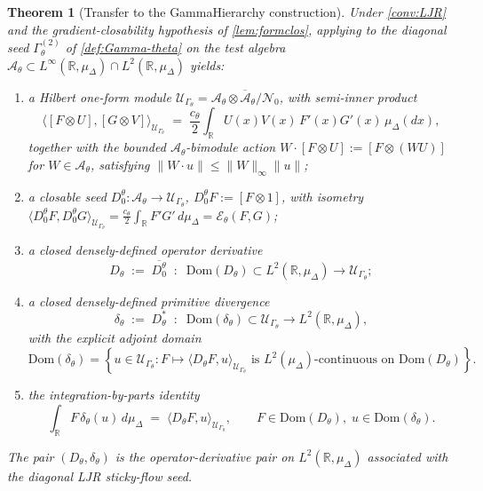 \documentclass[11pt,reqno]{amsart}
\theoremstyle{plain}
\newtheorem{theorem}{Theorem}[section]
\theoremstyle{definition}
\theoremstyle{remark}
\newcommand{\R}{\mathbb{R}}
\newcommand{\Dom}{\mathrm{Dom}}
\newcommand{\cA}{\mathcal A}
\newcommand{\cE}{\mathcal E}
\newcommand{\cU}{\mathcal U}
\newcommand{\Dth}{D_{\theta}}
\newcommand{\divth}{\delta_{\theta}}
\begin{document}
\begin{theorem}[Transfer to the GammaHierarchy construction]\label{thm:transfer}
Under \cref{conv:LJR} and the gradient-closability hypothesis of
\cref{lem:formclos}, applying
\cite[Thm.~A and Thm.~B]{GammaHierarchyDivergence} to the
diagonal seed $\Gamma^{(2)}_{\theta}$ of \cref{def:Gamma-theta}
on the test algebra $\cA_{\theta}\subset L^{\infty}(\R,\mu_{\Delta})\cap L^{2}(\R,\mu_{\Delta})$
yields:
\begin{enumerate}
\item[$(\mathrm i)$] a Hilbert one-form module
$\cU_{\Gamma_{\theta}}=\overline{\cA_{\theta}\otimes\cA_{\theta}/\mathcal N_{0}}$,
with semi-inner product
\[
  \langle [F\otimes U],[G\otimes V]\rangle_{\cU_{\Gamma_{\theta}}}
  \;=\;\frac{c_{\theta}}{2}\!\int_{\R}\!U(x)V(x)\,F'(x)G'(x)\,\mu_{\Delta}(dx),
\]
together with the bounded $\cA_{\theta}$-bimodule action
$W\cdot[F\otimes U]:=[F\otimes(WU)]$ for $W\in\cA_{\theta}$,
satisfying $\|W\cdot u\|\le\|W\|_{\infty}\|u\|$;
\item[$(\mathrm{ii})$] a closable seed
$D_{0}^{\theta}\colon\cA_{\theta}\to\cU_{\Gamma_{\theta}}$,
$D_{0}^{\theta}F:=[F\otimes 1]$, with isometry
$\langle D_{0}^{\theta}F,D_{0}^{\theta}G\rangle_{\cU_{\Gamma_{\theta}}}
=\frac{c_{\theta}}{2}\int_{\R}F'G'\,d\mu_{\Delta}=\cE_{\theta}(F,G)$;
\item[$(\mathrm{iii})$] a closed densely-defined operator
derivative
\[
  \Dth\;:=\;\overline{D_{0}^{\theta}}\;\;\colon\;\;\Dom(\Dth)\subset L^{2}(\R,\mu_{\Delta})\to\cU_{\Gamma_{\theta}};
\]
\item[$(\mathrm{iv})$] a closed densely-defined primitive
divergence
\[
  \divth\;:=\;\Dth^{*}\;\;\colon\;\;\Dom(\divth)\subset\cU_{\Gamma_{\theta}}\to L^{2}(\R,\mu_{\Delta}),
\]
with the explicit adjoint domain
\[
  \Dom(\divth)
  =
  \left\{
  u\in\cU_{\Gamma_{\theta}}:
  F\mapsto\langle\Dth F,u\rangle_{\cU_{\Gamma_{\theta}}}
  \text{ is }L^{2}(\mu_{\Delta})\text{-continuous on }\Dom(\Dth)
  \right\}.
\]
\item[$(\mathrm v)$] the integration-by-parts identity
\begin{equation}\label{eq:IBP-theta}
  \int_{\R}F\,\divth(u)\,d\mu_{\Delta}
  \;=\;\langle\Dth F,u\rangle_{\cU_{\Gamma_{\theta}}},
  \qquad F\in\Dom(\Dth),\;u\in\Dom(\divth).
\end{equation}
\end{enumerate}
The pair $(\Dth,\divth)$ is the operator-derivative pair on
$L^{2}(\R,\mu_{\Delta})$ associated with the diagonal LJR
sticky-flow seed.
\end{theorem}
\end{document}
